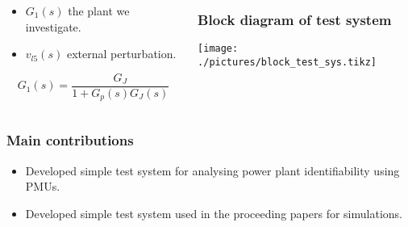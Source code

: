 \begin{frame}
	\begin{columns}
		\begin{column}{0.3\textwidth}
			\begin{itemize}
					\item $G_1(s)$ the plant we investigate.
					\item $v_{l5}(s)$ external perturbation.
			\end{itemize}
			\begin{equation*}
				G_1(s) = \frac{G_{J}}{1+G_p(s)G_J(s)}
			\end{equation*}
		\end{column}
		\begin{column}{0.7\textwidth}
			\frametitle{Block diagram of test system}
			\texttt{[image: ./pictures/block\_test\_sys.tikz]}
		\end{column}
	\end{columns}
\end{frame}
\begin{frame}
	\frametitle{Main contributions}
	\begin{itemize}
		\item Developed simple test system for analysing power plant identifiability using PMUs.
		\item Developed simple test system used in the proceeding papers for simulations.
	\end{itemize}
\end{frame}
